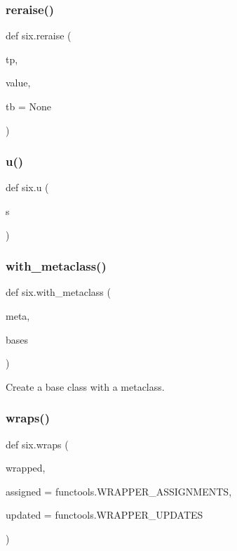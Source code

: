 \subsubsection{\texorpdfstring{reraise()}{reraise()}}
{\footnotesize\ttfamily def six.\+reraise (\begin{DoxyParamCaption}\item[{}]{tp,  }\item[{}]{value,  }\item[{}]{tb = {\ttfamily None} }\end{DoxyParamCaption})}

\mbox{\label{namespacesix_a4704ba0ec352ed62913e25fe339c4029}} 
\subsubsection{\texorpdfstring{u()}{u()}}
{\footnotesize\ttfamily def six.\+u (\begin{DoxyParamCaption}\item[{}]{s }\end{DoxyParamCaption})}

\mbox{\label{namespacesix_af599400254a842b0a0fc5dab5bcbe8a4}} 
\subsubsection{\texorpdfstring{with\+\_\+metaclass()}{with\_metaclass()}}
{\footnotesize\ttfamily def six.\+with\+\_\+metaclass (\begin{DoxyParamCaption}\item[{}]{meta,  }\item[{}]{bases }\end{DoxyParamCaption})}

\begin{DoxyVerb}Create a base class with a metaclass.\end{DoxyVerb}
 \mbox{\label{namespacesix_ac61e4b217e98112323ac2335dc9e2e99}} 
\subsubsection{\texorpdfstring{wraps()}{wraps()}}
{\footnotesize\ttfamily def six.\+wraps (\begin{DoxyParamCaption}\item[{}]{wrapped,  }\item[{}]{assigned = {\ttfamily functools.WRAPPER\+\_\+ASSIGNMENTS},  }\item[{}]{updated = {\ttfamily functools.WRAPPER\+\_\+UPDATES} }\end{DoxyParamCaption})}



